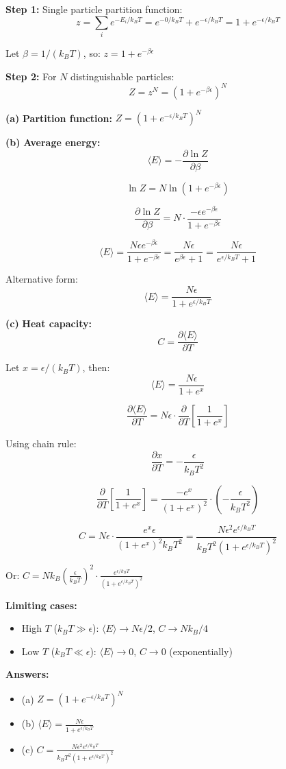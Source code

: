 \documentclass[12pt,a4paper]{article}
\begin{document}
\begin{solution}
\textbf{Step 1:} Single particle partition function:
$$z = \sum_{i} e^{-E_i/k_BT} = e^{-0/k_BT} + e^{-\epsilon/k_BT} = 1 + e^{-\epsilon/k_BT}$$

Let $\beta = 1/(k_BT)$, so: $z = 1 + e^{-\beta\epsilon}$

\textbf{Step 2:} For $N$ distinguishable particles:
$$Z = z^N = (1 + e^{-\beta\epsilon})^N$$

\textbf{(a)} \textbf{Partition function:} $Z = (1 + e^{-\epsilon/k_BT})^N$

\textbf{(b)} \textbf{Average energy:}
$$\langle E \rangle = -\frac{\partial \ln Z}{\partial \beta}$$

$$\ln Z = N\ln(1 + e^{-\beta\epsilon})$$

$$\frac{\partial \ln Z}{\partial \beta} = N \cdot \frac{-\epsilon e^{-\beta\epsilon}}{1 + e^{-\beta\epsilon}}$$

$$\langle E \rangle = \frac{N\epsilon e^{-\beta\epsilon}}{1 + e^{-\beta\epsilon}} = \frac{N\epsilon}{e^{\beta\epsilon} + 1} = \frac{N\epsilon}{e^{\epsilon/k_BT} + 1}$$

Alternative form:
$$\langle E \rangle = \frac{N\epsilon}{1 + e^{\epsilon/k_BT}}$$

\textbf{(c)} \textbf{Heat capacity:}
$$C = \frac{\partial \langle E \rangle}{\partial T}$$

Let $x = \epsilon/(k_BT)$, then:
$$\langle E \rangle = \frac{N\epsilon}{1 + e^x}$$

$$\frac{\partial \langle E \rangle}{\partial T} = N\epsilon \cdot \frac{\partial}{\partial T}\left[\frac{1}{1 + e^x}\right]$$

Using chain rule:
$$\frac{\partial x}{\partial T} = -\frac{\epsilon}{k_BT^2}$$

$$\frac{\partial}{\partial T}\left[\frac{1}{1 + e^x}\right] = \frac{-e^x}{(1 + e^x)^2} \cdot \left(-\frac{\epsilon}{k_BT^2}\right)$$

$$C = N\epsilon \cdot \frac{e^x \epsilon}{(1 + e^x)^2 k_BT^2} = \frac{N\epsilon^2 e^{\epsilon/k_BT}}{k_BT^2(1 + e^{\epsilon/k_BT})^2}$$

Or: $C = Nk_B\left(\frac{\epsilon}{k_BT}\right)^2 \cdot \frac{e^{\epsilon/k_BT}}{(1 + e^{\epsilon/k_BT})^2}$

\textbf{Limiting cases:}
\begin{itemize}
    \item High $T$ ($k_BT \gg \epsilon$): $\langle E \rangle \to N\epsilon/2$, $C \to Nk_B/4$
    \item Low $T$ ($k_BT \ll \epsilon$): $\langle E \rangle \to 0$, $C \to 0$ (exponentially)
\end{itemize}

\textbf{Answers:}
\begin{itemize}
    \item (a) $Z = (1 + e^{-\epsilon/k_BT})^N$
    \item (b) $\langle E \rangle = \frac{N\epsilon}{1 + e^{\epsilon/k_BT}}$
    \item (c) $C = \frac{N\epsilon^2 e^{\epsilon/k_BT}}{k_BT^2(1 + e^{\epsilon/k_BT})^2}$
\end{itemize}
\end{solution}
\end{document}
